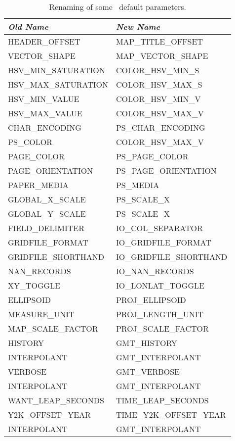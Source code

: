 \begin{table}[H]
\centering
\begin{tabular}{|l|l|} \hline
\emph{Old Name}	& \emph{New Name} \\ \hline
HEADER\_OFFSET			&	MAP\_TITLE\_OFFSET \\ \hline
VECTOR\_SHAPE			&	MAP\_VECTOR\_SHAPE \\ \hline
HSV\_MIN\_SATURATION		&	COLOR\_HSV\_MIN\_S \\ \hline
HSV\_MAX\_SATURATION		&	COLOR\_HSV\_MAX\_S \\ \hline
HSV\_MIN\_VALUE			&	COLOR\_HSV\_MIN\_V \\ \hline
HSV\_MAX\_VALUE			&	COLOR\_HSV\_MAX\_V \\ \hline
CHAR\_ENCODING			&	PS\_CHAR\_ENCODING \\ \hline
PS\_COLOR			&	COLOR\_HSV\_MAX\_V \\ \hline
PAGE\_COLOR			&	PS\_PAGE\_COLOR \\ \hline
PAGE\_ORIENTATION		&	PS\_PAGE\_ORIENTATION \\ \hline
PAPER\_MEDIA			&	PS\_MEDIA \\ \hline
GLOBAL\_X\_SCALE		&	PS\_SCALE\_X \\ \hline
GLOBAL\_Y\_SCALE		&	PS\_SCALE\_X \\ \hline
FIELD\_DELIMITER		&	IO\_COL\_SEPARATOR \\ \hline
GRIDFILE\_FORMAT		&	IO\_GRIDFILE\_FORMAT \\ \hline
GRIDFILE\_SHORTHAND		&	IO\_GRIDFILE\_SHORTHAND \\ \hline
NAN\_RECORDS			&	IO\_NAN\_RECORDS \\ \hline
XY\_TOGGLE			&	IO\_LONLAT\_TOGGLE \\ \hline
ELLIPSOID			&	PROJ\_ELLIPSOID \\ \hline
MEASURE\_UNIT			&	PROJ\_LENGTH\_UNIT \\ \hline
MAP\_SCALE\_FACTOR		&	PROJ\_SCALE\_FACTOR \\ \hline
HISTORY				&	GMT\_HISTORY \\ \hline
INTERPOLANT			&	GMT\_INTERPOLANT \\ \hline
VERBOSE				&	GMT\_VERBOSE \\ \hline
INTERPOLANT			&	GMT\_INTERPOLANT \\ \hline
WANT\_LEAP\_SECONDS		&	TIME\_LEAP\_SECONDS \\ \hline
Y2K\_OFFSET\_YEAR		&	TIME\_Y2K\_OFFSET\_YEAR \\ \hline
INTERPOLANT			&	GMT\_INTERPOLANT \\ \hline
\end{tabular}
\caption{Renaming of some \gmt\ default parameters.}
\label{tbl:obsoletedefs2}
\end{table}
